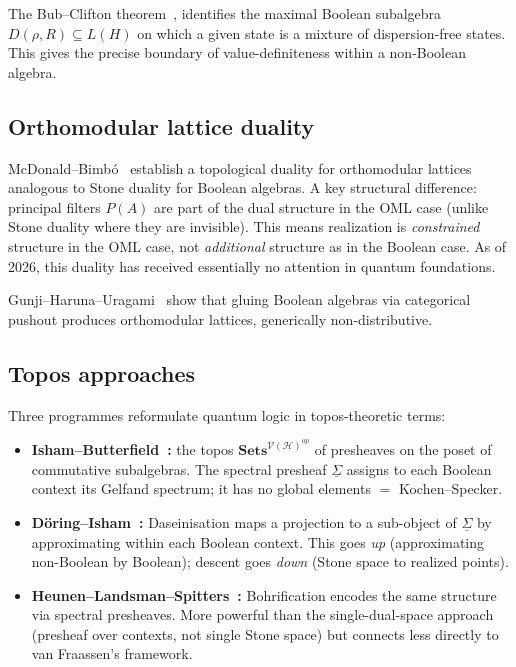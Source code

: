 The Bub--Clifton theorem~\cite{BubClifton1996},
\cite{HalvorsonClifton1999} identifies the maximal Boolean
subalgebra $D(\rho, R) \subseteq L(H)$ on which a given state is a
mixture of dispersion-free states.  This gives the precise boundary
of value-definiteness within a non-Boolean algebra.

\subsection{Orthomodular lattice duality}

McDonald--Bimb\'{o}~\cite{McDonaldBimbo2023} establish a topological
duality for orthomodular lattices analogous to Stone duality for
Boolean algebras.  A key structural difference: principal filters
$P(A)$ are part of the dual structure in the OML case (unlike Stone
duality where they are invisible).  This means realization is
\emph{constrained} structure in the OML case, not \emph{additional}
structure as in the Boolean case.  As of 2026, this duality has received essentially no attention in
quantum foundations.

Gunji--Haruna--Uragami~\cite{Gunji2026} show that gluing Boolean
algebras via categorical pushout produces orthomodular lattices,
generically non-distributive.

\subsection{Topos approaches}

Three programmes reformulate quantum logic in topos-theoretic terms:

\begin{itemize}
  \item \textbf{Isham--Butterfield~\cite{IshamButterfield1998}:}
    the topos $\mathbf{Sets}^{\mathcal{V}(\mathcal{H})^{op}}$ of
    presheaves on the poset of commutative subalgebras.  The spectral
    presheaf $\underline{\Sigma}$ assigns to each Boolean context its
    Gelfand spectrum; it has no global elements $=$ Kochen--Specker.

  \item \textbf{D\"{o}ring--Isham~\cite{DoringIsham2008}:}
    Daseinisation maps a projection to a sub-object of
    $\underline{\Sigma}$ by approximating within each Boolean context.
    This goes \emph{up} (approximating non-Boolean by Boolean);
    descent goes \emph{down} (Stone space to realized points).

  \item \textbf{Heunen--Landsman--Spitters~\cite{HeunenLandsmanSpitters2009}:}
    Bohrification encodes the same structure via spectral presheaves.
    More powerful than the single-dual-space approach (presheaf over
    contexts, not single Stone space) but connects less directly to
    van Fraassen's framework.
\end{itemize}

